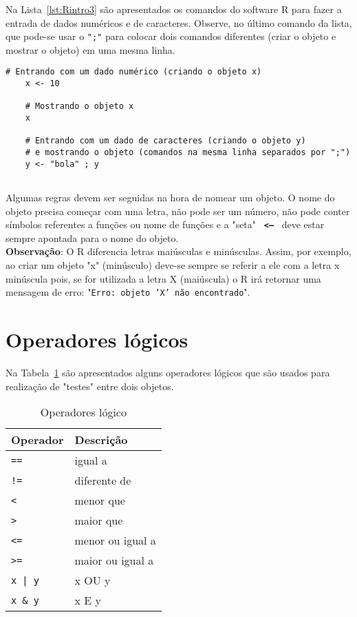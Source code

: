 \documentclass[11pt,fleqn]{book} %
\begin{document}
Na Lista~\ref{lst:Rintro3} são apresentados os comandos do software R para fazer a entrada de dados numéricos e de caracteres. Observe, no último comando da lista, que pode-se usar o \texttt{";"} para colocar dois comandos diferentes (criar o objeto e mostrar o objeto) em uma mesma linha. \\


\begin{scriptsize}
	\estiloR
	\begin{lstlisting}[caption={Comandos do software R}, label=lst:Rintro3]
	# Entrando com um dado numérico (criando o objeto x)
	x <- 10
	
	# Mostrando o objeto x
	x
		
	# Entrando com um dado de caracteres (criando o objeto y)
	# e mostrando o objeto (comandos na mesma linha separados por ";")
	y <- "bola" ; y
	
	\end{lstlisting}
\end{scriptsize}


Algumas regras devem ser seguidas na hora de nomear um objeto. O nome do objeto precisa começar com uma letra, não pode ser um número, não pode conter símbolos referentes a funções ou nome de funções e a "seta" \, {\bf \texttt{<--}} \, deve estar sempre apontada para o nome do objeto. \\

{\bf Observação}: O R diferencia letras maiúsculas e minúsculas. Assim, por exemplo, ao criar um objeto "x" (minúsculo) deve-se sempre se referir a ele com a letra x minúscula pois, se for utilizada a letra X (maiúscula) o R irá retornar uma mensagem de erro: "\texttt{Erro: objeto 'X' não encontrado}".\\


\section{Operadores lógicos}

Na Tabela~\ref{tab:oplog} são apresentados alguns operadores lógicos que são usados para realização de "testes" entre dois objetos.

\begin{table}[h]
	\caption{Operadores lógico}
	\label{tab:oplog} 
	\vspace{0.1cm}
	\centering
	\begin{tabular}{l l}
	\toprule
	\textbf{Operador} & \textbf{Descrição}\\
	\midrule
	\texttt{==} 	& igual a \\
	\texttt{!=} 	& diferente de \\
	\texttt{<}  	& menor que \\
	\texttt{>}  	& maior que \\
	\texttt{<=} 	& menor ou igual a \\
	\texttt{>=} 	& maior ou igual a \\
	\texttt{x | y}	& x OU y \\
	\texttt{x \& y}  & x E y\\
	\bottomrule
	\end{tabular} \\
\end{table}
\end{document}
